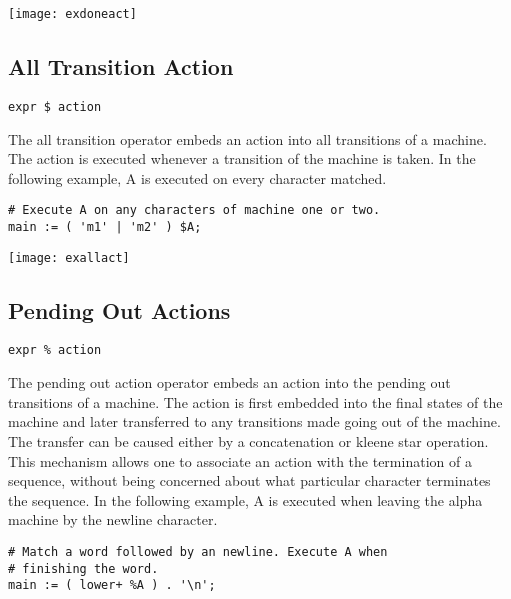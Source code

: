 \documentclass[letterpaper,11pt,oneside]{book}
\newcommand{\verbspace}{\vspace{10pt}}
\newcommand{\graphspace}{\vspace{10pt}}
\newenvironment{inline_code}{\def\baselinestretch{1}\vspace{12pt}\small}{}
\begin{document}
\graphspace
\begin{center}
\texttt{[image: exdoneact]}
\end{center}
\graphspace


\subsection{All Transition Action}

\verb|expr $ action|
\verbspace

The all transition operator embeds an action into all transitions of a machine.
The action is executed whenever a transition of the machine is taken. In the
following example, A is executed on every character matched.

\begin{inline_code}
\begin{verbatim}
# Execute A on any characters of machine one or two.
main := ( 'm1' | 'm2' ) $A;
\end{verbatim}
\end{inline_code}

\graphspace
\begin{center}
\texttt{[image: exallact]}
\end{center}
\graphspace


\subsection{Pending Out Actions}
\label{out-actions}

\verb|expr % action|
\verbspace

The pending out action operator embeds an action into the pending out
transitions of a machine. The action is first embedded into the final states of
the machine and later transferred to any transitions made going out of the
machine. The transfer can be caused either by a concatenation or kleene star
operation.  This mechanism allows one to associate an action with the
termination of a sequence, without being concerned about what particular
character terminates the sequence.  In the following example, A is executed
when leaving the alpha machine by the newline character.

\begin{inline_code}
\begin{verbatim}
# Match a word followed by an newline. Execute A when 
# finishing the word.
main := ( lower+ %A ) . '\n';
\end{verbatim}
\end{inline_code}
\end{document}
